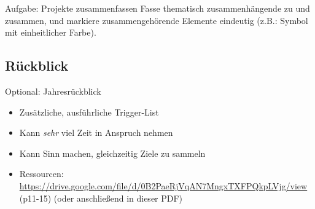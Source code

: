 \begin{frame}[c]
    \large
    \begin{block}{Aufgabe: Projekte zusammenfassen}
    Fasse thematisch zusammenhängende  zu  und
     zusammen, und markiere zusammengehörende Elemente
    eindeutig (z.B.: Symbol mit einheitlicher Farbe).
    \end{block}
\end{frame}


\subsection{Rückblick}

\begin{frame}[c]{Optional: Jahresrückblick}
    \begin{itemize}[<+(1)->]
        \item Zusätzliche, ausführliche Trigger-List
        \item Kann {\em sehr} viel Zeit in Anspruch nehmen
        \item Kann Sinn machen, gleichzeitig Ziele zu sammeln
        \item Ressourcen: \url{https://drive.google.com/file/d/0B2PaeRjVqAN7MngxTXFPQkpLVjg/view} \cite{8760-hours} (p11-15) (oder anschließend in dieser PDF)
    \end{itemize}
\end{frame}

% 
% 
{
    \addtocounter{framenumber}{5}
    
}

\fpause
